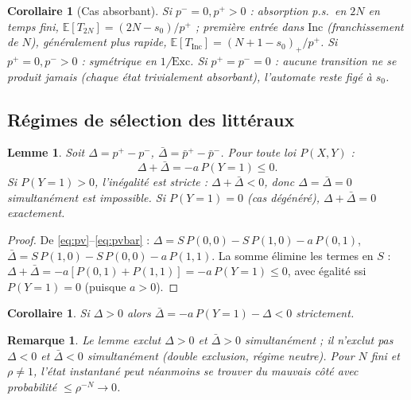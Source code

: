 \documentclass[12pt,a4paper]{article}
\newtheorem{lemma}[theorem]{Lemme}
\newtheorem{corollary}[theorem]{Corollaire}
\newtheorem{remark}[theorem]{Remarque}
\newcommand{\Inc}{\ensuremath{\mathrm{Inc}}}
\newcommand{\Exc}{\ensuremath{\mathrm{Exc}}}
\begin{document}
\begin{corollary}[Cas absorbant]\label{cor:absorb}
Si $p^-=0,p^+>0$ : absorption p.s.\ en $2N$ en temps fini,
$\mathbb E[T_{2N}]=(2N-s_0)/p^+$ ; première entrée dans $\Inc$ (franchissement
de $N$), généralement plus rapide, $\mathbb E[T_{\Inc}]=(N+1-s_0)_+/p^+$. Si
$p^+=0,p^->0$ : symétrique en $1$/$\Exc$. Si $p^+=p^-=0$ : aucune transition
ne se produit jamais (chaque état trivialement absorbant), l'automate reste
figé à $s_0$.
\end{corollary}

\subsection{Régimes de sélection des littéraux}

\begin{lemma}\label{lem:excl}
Soit $\Delta=p^+-p^-$, $\bar\Delta=\bar p^+-\bar p^-$. Pour toute loi $P(X,Y)$ :
\[
  \Delta+\bar\Delta = -a\,P(Y{=}1) \le 0.
\]
Si $P(Y{=}1)>0$, l'inégalité est \emph{stricte} : $\Delta+\bar\Delta<0$, donc
$\Delta=\bar\Delta=0$ simultanément est impossible. Si $P(Y{=}1)=0$ (cas
dégénéré), $\Delta+\bar\Delta=0$ exactement.
\end{lemma}

\begin{proof}
De \eqref{eq:pv}--\eqref{eq:pvbar} : $\Delta = S\,P(0,0)-S\,P(1,0)-a\,P(0,1)$,
$\bar\Delta = S\,P(1,0)-S\,P(0,0)-a\,P(1,1)$. La somme élimine les termes en
$S$ : $\Delta+\bar\Delta=-a[P(0,1)+P(1,1)]=-a\,P(Y{=}1)\le0$, avec égalité
ssi $P(Y{=}1)=0$ (puisque $a>0$).
\end{proof}

\begin{corollary}\label{cor:asym}
Si $\Delta>0$ alors $\bar\Delta=-a\,P(Y{=}1)-\Delta<0$ strictement.
\end{corollary}

\begin{remark}
Le lemme exclut $\Delta>0$ et $\bar\Delta>0$ simultanément ; il n'exclut pas
$\Delta<0$ et $\bar\Delta<0$ simultanément (double exclusion, régime neutre).
Pour $N$ fini et $\rho\ne1$, l'état instantané peut néanmoins se trouver du
mauvais côté avec probabilité $\le\rho^{-N}\to0$.
\end{remark}
\end{document}
